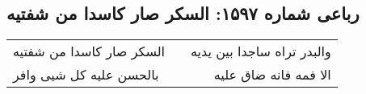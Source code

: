 \begin{center}
\section*{رباعی شماره ۱۵۹۷: السکر صار کاسدا من شفتیه}
\label{sec:1597}
\begin{longtable}{l p{0.5cm} r}
السکر صار کاسدا من شفتیه
&&
والبدر تراه ساجدا بین یدیه
\\
بالحسن علیه کل شیی وافر
&&
الا فمه فانه ضاق علیه
\\
\end{longtable}
\end{center}
